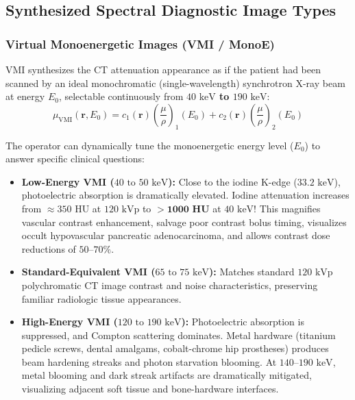 \documentclass[11pt,a4paper]{article}
\begin{document}
\subsection{Synthesized Spectral Diagnostic Image Types}

\subsubsection{Virtual Monoenergetic Images (VMI / MonoE)}
VMI synthesizes the CT attenuation appearance as if the patient had been scanned by an ideal monochromatic (single-wavelength) synchrotron X-ray beam at energy $E_0$, selectable continuously from \textbf{$40\text{ keV}$ to $190\text{ keV}$}:
\begin{equation}
    \mu_{\text{VMI}}(\mathbf{r}, E_0) = c_1(\mathbf{r}) \left( \frac{\mu}{\rho} \right)_1(E_0) + c_2(\mathbf{r}) \left( \frac{\mu}{\rho} \right)_2(E_0)
\end{equation}

\begin{clinicalpearl}
The operator can dynamically tune the monoenergetic energy level ($E_0$) to answer specific clinical questions:
\begin{itemize}
    \item \textbf{Low-Energy VMI ($40\text{ to }50\text{ keV}$):} Close to the iodine K-edge ($33.2\text{ keV}$), photoelectric absorption is dramatically elevated. Iodine attenuation increases from $\approx 350\text{ HU}$ at $120\text{ kVp}$ to $\mathbf{> 1000\text{ HU}}$ at $40\text{ keV}$! This magnifies vascular contrast enhancement, salvage poor contrast bolus timing, visualizes occult hypovascular pancreatic adenocarcinoma, and allows contrast dose reductions of $50\text{--}70\%$.
    \item \textbf{Standard-Equivalent VMI ($65\text{ to }75\text{ keV}$):} Matches standard $120\text{ kVp}$ polychromatic CT image contrast and noise characteristics, preserving familiar radiologic tissue appearances.
    \item \textbf{High-Energy VMI ($120\text{ to }190\text{ keV}$):} Photoelectric absorption is suppressed, and Compton scattering dominates. Metal hardware (titanium pedicle screws, dental amalgams, cobalt-chrome hip prostheses) produces beam hardening streaks and photon starvation blooming. At $140\text{--}190\text{ keV}$, metal blooming and dark streak artifacts are dramatically mitigated, visualizing adjacent soft tissue and bone-hardware interfaces.
\end{itemize}
\end{clinicalpearl}
\end{document}
